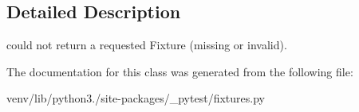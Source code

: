 \subsection{Detailed Description}
\begin{DoxyVerb}could not return a requested Fixture (missing or invalid). \end{DoxyVerb}
 

The documentation for this class was generated from the following file\+:\begin{DoxyCompactItemize}
\item 
venv/lib/python3./site-\/packages/\+\_\+pytest/fixtures.\+py\end{DoxyCompactItemize}
